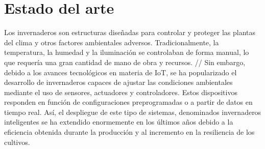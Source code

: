 



\section{Estado del arte}
\label{sec:Estado del arte}

Los invernaderos son estructuras diseñadas para controlar y proteger las plantas del clima y otros factores ambientales adversos. Tradicionalmente, la temperatura, la humedad y la iluminación se controlaban de forma manual, lo que requería una gran cantidad de mano de obra y recursos. //
Sin embargo, debido a los avances tecnológicos en materia de IoT, se ha popularizado el desarrollo de invernaderos capaces de ajustar las condiciones ambientales mediante el uso de sensores, actuadores y controladores. Estos dispositivos responden en función de configuraciones preprogramadas o a partir de datos en tiempo real.  
Así, el despliegue de este tipo de sistemas, denominados invernaderos inteligentes se ha extendido enormemente en los últimos años debido a la eficiencia obtenida durante la producción y al incremento en la resiliencia de los cultivos\citep{agrofacto}.



